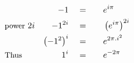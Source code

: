 \begin{alignat*}{5}
&\,&-1\quad&=\quad&&e^{i\pi}\\
&\small\text{power }2i&-1^{2i}\normalsize\quad&=&&\left(e^{i\pi}\right)^{2i}\\
&\,&\left(-1^2\right)^i\quad&=&&e^{2\pi.i^2}\\
&\small\text{Thus}&1^i\quad&=&&e^{-2\pi}
\end{alignat*}
